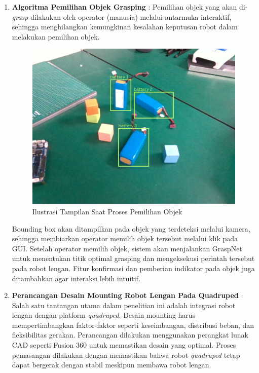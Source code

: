\begin{enumerate}
  \item \textbf{Algoritma Pemilihan Objek Grasping} : Pemilihan objek yang akan di-\emph{grasp} dilakukan
  oleh operator (manusia) melalui antarmuka interaktif, sehingga menghilangkan kemungkinan kesalahan
  keputusan robot dalam melakukan pemilihan objek.
  \begin{figure} [H] \centering
    \includegraphics[scale=0.5]{gambar/pemilihan objek.png}
    \caption{Ilustrasi Tampilan Saat Proses Pemilihan Objek}
    \label{fig:pemilihan_objek}
  \end{figure}
  Bounding box akan ditampilkan pada objek yang terdeteksi
  melalui kamera, sehingga membiarkan operator memilih objek tersebut melalui klik pada GUI. Setelah operator
  memilih objek, sistem akan menjalankan GraspNet untuk menentukan titik optimal grasping dan
  mengeksekusi perintah tersebut pada robot lengan. Fitur konfirmasi dan pemberian indikator pada objek
  juga ditambahkan agar interaksi lebih intuitif.
  
  \item \textbf{Perancangan Desain Mounting Robot Lengan Pada Quadruped} : Salah satu tantangan utama dalam penelitian
  ini adalah integrasi robot lengan dengan platform \emph{quadruped}. Desain mounting harus mempertimbangkan faktor-faktor
  seperti keseimbangan, distribusi beban, dan fleksibilitas gerakan. Perancangan dilakukan menggunakan perangkat lunak CAD
  seperti Fusion 360 untuk memastikan desain yang optimal. Proses pemasangan dilakukan dengan memastikan bahwa robot
  \emph{quadruped} tetap dapat bergerak dengan stabil meskipun membawa robot lengan.
  

\end{enumerate}
